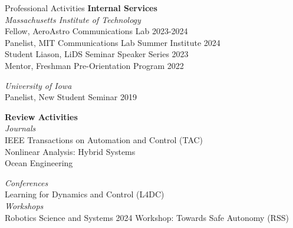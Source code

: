 \begin{rSection}{Professional Activities}
    \textbf{Internal Services}\\
    \textit{Massachusetts Institute of Technology}\\
    Fellow, AeroAstro Communications Lab \hfill 2023-2024\\
    Panelist, MIT Communications Lab Summer Institute \hfill 2024\\
    Student Liason, LiDS Seminar Speaker Series \hfill 2023\\
    Mentor, Freshman Pre-Orientation Program \hfill 2022

    \textit{University of Iowa}\\
    Panelist, New Student Seminar \hfill 2019

    \pagebreak
    \textbf{Review Activities}\\
    \textit{Journals}\\
    IEEE Transactions on Automation and Control (TAC)\\
    Nonlinear Analysis: Hybrid Systems\\
    Ocean Engineering

    \textit{Conferences}\\
    Learning for Dynamics and Control (L4DC)\\

    \textit{Workshops}\\
    Robotics Science and Systems 2024 Workshop: Towards Safe Autonomy (RSS)

\end{rSection}